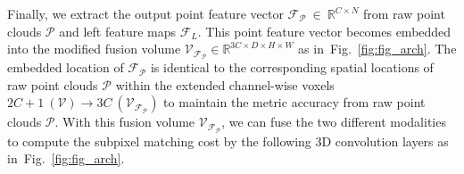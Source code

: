 \documentclass[letterpaper, 10 pt, conference]{ieeeconf}
\newcommand{\Fref}[1]{Fig.~\textcolor{blue}{\ref{#1}}}
\begin{document}
Finally, we extract the output point feature vector $\mathcal{F}_{\mathcal{P}}~\in~\mathbb{R}^{C \times N}$ from raw point clouds $\mathcal{P}$ and left feature maps $\mathcal{F}_{L}$. This point feature vector becomes embedded into the modified fusion volume $\mathcal{V}_{\mathcal{F}_{\mathcal{P}}} \in \mathbb{R}^{3C \times D \times H \times W}$ as in~\Fref{fig:fig_arch}. The embedded location of $\mathcal{F}_{\mathcal{P}}$ is identical to the corresponding spatial locations of raw point clouds $\mathcal{P}$ within the extended channel-wise voxels $2C+1 \ (\mathcal{V}) \rightarrow 3C \ (\mathcal{V}_{\mathcal{F}_{\mathcal{P}}})$ to maintain the metric accuracy from raw point clouds $\mathcal{P}$. With this fusion volume $\mathcal{V}_{\mathcal{F}_{\mathcal{P}}}$, we can fuse the two different modalities to compute the subpixel matching cost by the following 3D convolution layers as in~\Fref{fig:fig_arch}.
\end{document}
